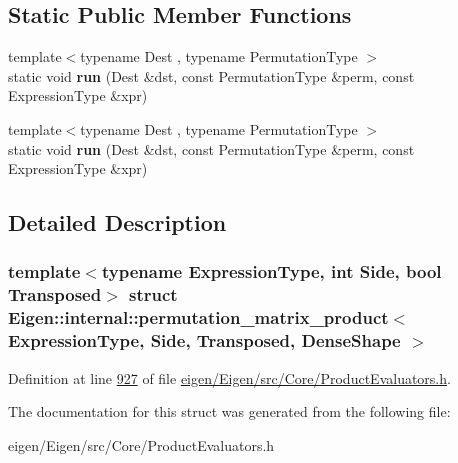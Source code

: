 \subsection*{Static Public Member Functions}
\begin{DoxyCompactItemize}
\item 
\mbox{\label{struct_eigen_1_1internal_1_1permutation__matrix__product_3_01_expression_type_00_01_side_00_01_t00744509fe9d67128974220180aea840_a3210a391ac134c77d74d8542d6ed57dd}} 
{\footnotesize template$<$typename Dest , typename Permutation\+Type $>$ }\\static void {\bfseries run} (Dest \&dst, const Permutation\+Type \&perm, const Expression\+Type \&xpr)
\item 
\mbox{\label{struct_eigen_1_1internal_1_1permutation__matrix__product_3_01_expression_type_00_01_side_00_01_t00744509fe9d67128974220180aea840_a3210a391ac134c77d74d8542d6ed57dd}} 
{\footnotesize template$<$typename Dest , typename Permutation\+Type $>$ }\\static void {\bfseries run} (Dest \&dst, const Permutation\+Type \&perm, const Expression\+Type \&xpr)
\end{DoxyCompactItemize}


\subsection{Detailed Description}
\subsubsection*{template$<$typename Expression\+Type, int Side, bool Transposed$>$\newline
struct Eigen\+::internal\+::permutation\+\_\+matrix\+\_\+product$<$ Expression\+Type, Side, Transposed, Dense\+Shape $>$}



Definition at line \hyperlink{eigen_2_eigen_2src_2_core_2_product_evaluators_8h_source_l00927}{927} of file \hyperlink{eigen_2_eigen_2src_2_core_2_product_evaluators_8h_source}{eigen/\+Eigen/src/\+Core/\+Product\+Evaluators.\+h}.



The documentation for this struct was generated from the following file\+:\begin{DoxyCompactItemize}
\item 
eigen/\+Eigen/src/\+Core/\+Product\+Evaluators.\+h\end{DoxyCompactItemize}
